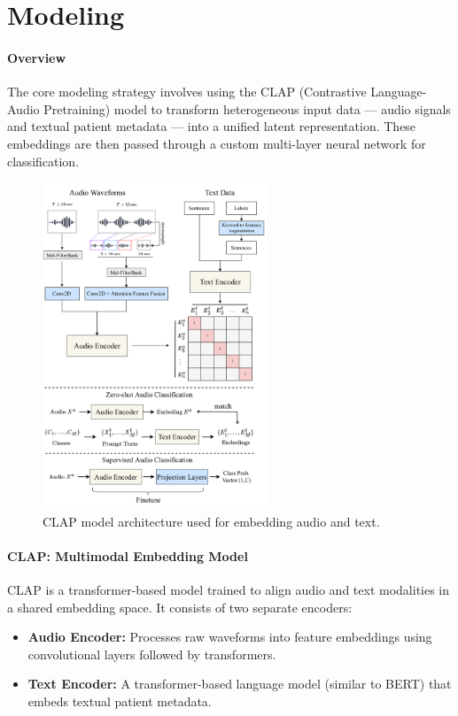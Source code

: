 \break
\section{Modeling}

\paragraph{Overview}
The core modeling strategy involves using the CLAP (Contrastive Language-Audio Pretraining) model to transform heterogeneous input data — audio signals and textual patient metadata — into a unified latent representation. These embeddings are then passed through a custom multi-layer neural network for classification.

\begin{figure}[H]
    \centering
    \includegraphics[width=0.6\textwidth]{Chapter4/audioclip-arch.png}
    \caption{CLAP model architecture used for embedding audio and text.}
    \label{fig:clap-model}
\end{figure}

\paragraph{CLAP: Multimodal Embedding Model}
CLAP is a transformer-based model trained to align audio and text modalities in a shared embedding space. It consists of two separate encoders:
\begin{itemize}
    \item \textbf{Audio Encoder:} Processes raw waveforms into feature embeddings using convolutional layers followed by transformers.
    \item \textbf{Text Encoder:} A transformer-based language model (similar to BERT) that embeds textual patient metadata.
\end{itemize}

